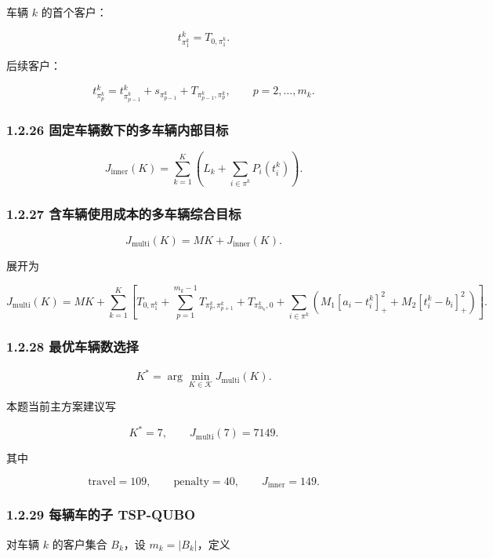 \documentclass[
  a4paper,
]{ctexart}
\begin{document}
车辆 \(k\) 的首个客户：

\[
t_{\pi_1^k}^{k}=T_{0,\pi_1^k}.
\]

后续客户：

\[
t_{\pi_p^k}^{k}=t_{\pi_{p-1}^k}^{k}+s_{\pi_{p-1}^k}+T_{\pi_{p-1}^k,\pi_p^k},\qquad p=2,\ldots,m_k.
\]

\subsubsection{1.2.26
固定车辆数下的多车辆内部目标}\label{ux56faux5b9aux8f66ux8f86ux6570ux4e0bux7684ux591aux8f66ux8f86ux5185ux90e8ux76eeux6807}

\[
J_{\mathrm{inner}}(K)=\sum_{k=1}^{K}\left(L_k+\sum_{i\in\pi^k}P_i(t_i^k)\right).
\]

\subsubsection{1.2.27
含车辆使用成本的多车辆综合目标}\label{ux542bux8f66ux8f86ux4f7fux7528ux6210ux672cux7684ux591aux8f66ux8f86ux7efcux5408ux76eeux6807}

\[
J_{\mathrm{multi}}(K)=M K+J_{\mathrm{inner}}(K).
\]

展开为

\[
J_{\mathrm{multi}}(K)=M K+\sum_{k=1}^{K}\left[
T_{0,\pi_1^k}+\sum_{p=1}^{m_k-1}T_{\pi_p^k,\pi_{p+1}^k}+T_{\pi_{m_k}^k,0}
+\sum_{i\in\pi^k}\left(M_1[a_i-t_i^k]_+^2+M_2[t_i^k-b_i]_+^2\right)
\right].
\]

\subsubsection{1.2.28
最优车辆数选择}\label{ux6700ux4f18ux8f66ux8f86ux6570ux9009ux62e9}

\[
K^*=\arg\min_{K\in\mathcal K}J_{\mathrm{multi}}(K).
\]

本题当前主方案建议写

\[
K^*=7,\qquad J_{\mathrm{multi}}(7)=7149.
\]

其中

\[
\text{travel}=109,
\qquad
\text{penalty}=40,
\qquad
J_{\mathrm{inner}}=149.
\]

\subsubsection{1.2.29 每辆车的子
TSP-QUBO}\label{ux6bcfux8f86ux8f66ux7684ux5b50-tsp-qubo}

对车辆 \(k\) 的客户集合 \(B_k\)，设 \(m_k=|B_k|\)，定义
\end{document}
